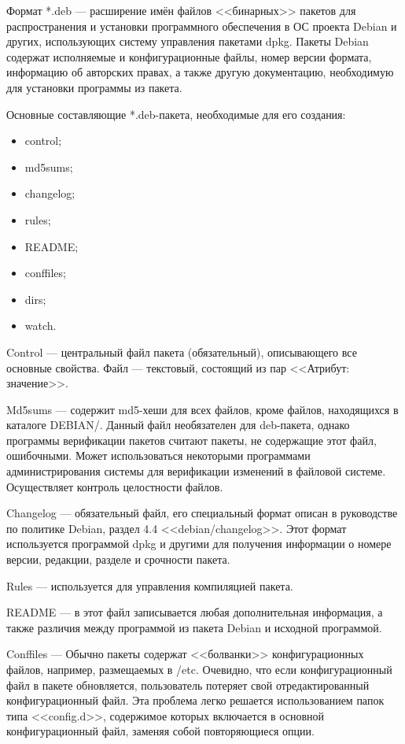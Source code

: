 Формат *.deb --- расширение имён файлов <<бинарных>> пакетов для распространения и установки программного обеспечения в ОС проекта Debian и других, использующих систему управления пакетами dpkg. Пакеты Debian содержат исполняемые и конфигурационные файлы, номер версии формата, информацию об авторских правах, а также другую документацию, необходимую для установки программы из пакета.

Основные составляющие *.deb-пакета, необходимые для его создания:
\begin{itemize}
  \item control;
  \item md5sums;
  \item changelog;
  \item rules;
  \item README;
  \item conffiles;
  \item dirs;
  \item watch.
\end{itemize}

Control --- центральный файл пакета (обязательный), описывающего все основные свойства. Файл --- текстовый, состоящий из пар <<Атрибут: значение>>.

Md5sums --- содержит md5-хеши для всех файлов, кроме файлов, находящихся в каталоге DEBIAN/. Данный файл необязателен для deb-пакета, 
однако программы верификации пакетов считают пакеты, не содержащие этот файл, ошибочными. Может использоваться некоторыми программами администрирования системы для верификации изменений в файловой системе. Осуществляет контроль целостности файлов.

Changelog --- обязательный файл, его специальный формат описан в руководстве по политике Debian, раздел 4.4 <<debian/changelog>>. Этот формат используется программой dpkg и другими для получения информации о номере версии, редакции, разделе и срочности пакета.~\cite{deb_package_howto}

Rules --- используется для управления компиляцией пакета. 

README --- в этот файл записывается любая дополнительная информация, а также различия между программой из пакета Debian и исходной программой.

Conffiles --- Обычно пакеты содержат <<болванки>> конфигурационных файлов, например, размещаемых в /etc. Очевидно, что если конфигурационный файл в пакете обновляется, пользователь потеряет свой отредактированный конфигурационный файл. Эта проблема легко решается использованием папок типа <<config.d>>, содержимое которых включается в основной конфигурационный файл, заменяя собой повторяющиеся опции.~\cite{deb_man}

